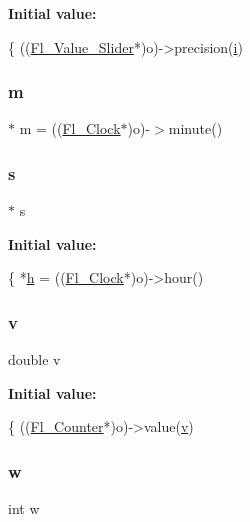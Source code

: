 {\bfseries Initial value\+:}
\begin{DoxyCode}
\{
    ((\hyperlink{class_fl___value___slider}{Fl\_Value\_Slider}*)o)->precision(\hyperlink{forms_8_h_acb559820d9ca11295b4500f179ef6392}{i})
\end{DoxyCode}
\mbox{\label{forms_8_h_a2ccd5640c2b2869841c5dab22b937079}} 
\subsubsection{\texorpdfstring{m}{m}}
{\footnotesize\ttfamily $\ast$ m = ((\hyperlink{class_fl___clock}{Fl\+\_\+\+Clock}$\ast$)o)-\/$>$minute()}

\mbox{\label{forms_8_h_a672b4f0a8c8a6db61068c721f799d87f}} 
\subsubsection{\texorpdfstring{s}{s}}
{\footnotesize\ttfamily $\ast$ s}

{\bfseries Initial value\+:}
\begin{DoxyCode}
\{
    *\hyperlink{forms_8_h_a7e427ba5b307f9068129699250690066}{h} = ((\hyperlink{class_fl___clock}{Fl\_Clock}*)o)->hour()
\end{DoxyCode}
\mbox{\label{forms_8_h_a3b90d5a73541ab9402511d87bed076ef}} 
\subsubsection{\texorpdfstring{v}{v}}
{\footnotesize\ttfamily double v}

{\bfseries Initial value\+:}
\begin{DoxyCode}
\{
    ((\hyperlink{class_fl___counter}{Fl\_Counter}*)o)->value(\hyperlink{forms_8_h_a3b90d5a73541ab9402511d87bed076ef}{v})
\end{DoxyCode}
\mbox{\label{forms_8_h_aac374e320caaadeca4874add33b62af2}} 
\subsubsection{\texorpdfstring{w}{w}}
{\footnotesize\ttfamily int w}

